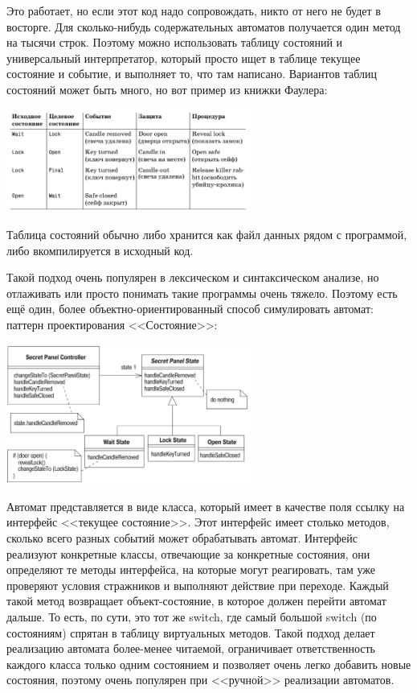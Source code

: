 \documentclass{../mcstext}
\begin{document}
Это работает, но если этот код надо сопровождать, никто от него не будет в восторге. Для сколько-нибудь содержательных автоматов получается один метод на тысячи строк. Поэтому можно использовать таблицу состояний и универсальный интерпретатор, который просто ищет в таблице текущее состояние и событие, и выполняет то, что там написано. Вариантов таблиц состояний может быть много, но вот пример из книжки Фаулера:

\begin{center}
    \includegraphics[width=0.6\textwidth]{stateTransitionStateTable.png}
\end{center}

Таблица состояний обычно либо хранится как файл данных рядом с программой, либо вкомпилируется в исходный код. 

Такой подход очень популярен в лексическом и синтаксическом анализе, но отлаживать или просто понимать такие программы очень тяжело. Поэтому есть ещё один, более объектно-ориентированный способ симулировать автомат: паттерн проектирования <<Состояние>>:

\begin{center}
    \includegraphics[width=0.6\textwidth]{stateTransitionStatePattern.png}
\end{center}

Автомат представляется в виде класса, который имеет в качестве поля ссылку на интерфейс <<текущее состояние>>. Этот интерфейс имеет столько методов, сколько всего разных событий может обрабатывать автомат. Интерфейс реализуют конкретные классы, отвечающие за конкретные состояния, они определяют те методы интерфейса, на которые могут реагировать, там уже проверяют условия стражников и выполняют действие при переходе. Каждый такой метод возвращает объект-состояние, в которое должен перейти автомат дальше. То есть, по сути, это тот же switch, где самый большой switch (по состояниям) спрятан в таблицу виртуальных методов. Такой подход делает реализацию автомата более-менее читаемой, ограничивает ответственность каждого класса только одним состоянием и позволяет очень легко добавить новые состояния, поэтому очень популярен при <<ручной>> реализации автоматов.
\end{document}
